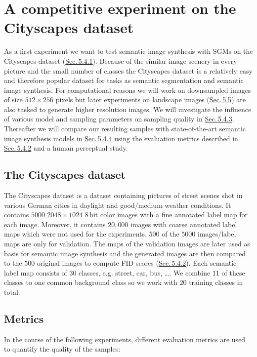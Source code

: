 
\section[A competitive experiment on the Cityscapes dataset]{A competitive experiment on the Cityscapes dataset%
    } \label{sec:5.4}
%
As a first experiment we want to test semantic image synthesis with SGMs on the Cityscapes dataset \cite{cityscapes} (\hyperref[sec:5.4.1]{Sec.\,5.4.1}). Because of the similar image scenery in every picture and the small number of classes the Cityscapes dataset is a relatively easy and therefore popular dataset for tasks as semantic segmentation and semantic image synthesis. For computational reasons we will work on downsampled images of size $512\times256$ pixels but later experiments on landscape images (\hyperref[sec:5.5]{Sec.\,5.5}) are also tasked to generate higher resolution images. We will investigate the influence of various model and sampling parameters on sampling quality in \hyperref[sec:5.4.3]{Sec.\,5.4.3}. Thereafter we will compare our resulting samples with state-of-the-art semantic image synthesis models in \hyperref[sec:5.4.4]{Sec.\,5.4.4} using the evaluation metrics described in \hyperref[sec:5.4.2]{Sec.\,5.4.2} and a human perceptual study.

\subsection{The Cityscapes dataset}
The Cityscapes dataset \cite{cityscapes} is a dataset containing pictures of street scenes shot in various German cities in daylight and good/medium weather conditions. It contains $5000$ $2048\times1024$ $8$\,bit color images with a fine annotated label map for each image. Moreover, it contains $20{,}000$ images with coarse annotated label maps which were not used for the experiments. $500$ of the $5000$ images/label maps are only for validation. The maps of the validation images are later used as basis for semantic image synthesis and the generated images are then compared to the $500$ original images to compute FID scores (\hyperref[sec:fid]{Sec.\,5.4.2}). Each semantic label map consists of $30$ classes, e.g. street, car, bus, \dots. We combine $11$ of these classes to one common background class so we work with $20$ training classes in total.
%
\subsection{Metrics} \label{sec:5.4.2}
In the course of the following experiments, different evaluation metrics are used to quantify the quality of the samples:
%

